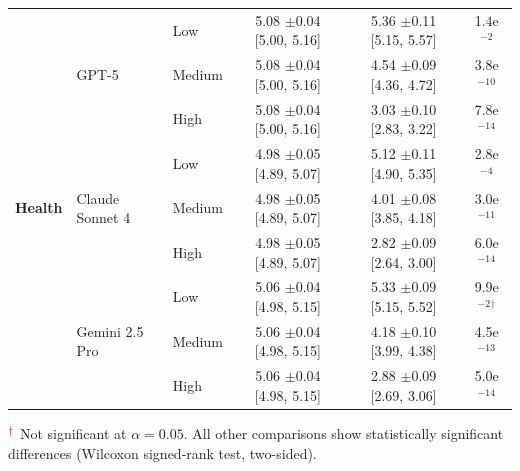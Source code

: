 \begin{table}[htb!]
\begin{tabular}{ll l c c c}
 \multirow{9}{*}{\textbf{Health}}
 & \multirow{3}{*}{GPT-5}
   & Low    & 5.08 $\pm$0.04 [5.00, 5.16] & 5.36 $\pm$0.11 [5.15, 5.57] & 1.4e$^{-2}$ \\
 &  & Medium & 5.08 $\pm$0.04 [5.00, 5.16] & 4.54 $\pm$0.09 [4.36, 4.72] & 3.8e$^{-10}$ \\
 &  & High   & 5.08 $\pm$0.04 [5.00, 5.16] & 3.03 $\pm$0.10 [2.83, 3.22] & 7.8e$^{-14}$ \\
 \cmidrule(lr){2-6}
 & \multirow{3}{*}{Claude Sonnet 4}
   & Low    & 4.98 $\pm$0.05 [4.89, 5.07] & 5.12 $\pm$0.11 [4.90, 5.35] & 2.8e$^{-4}$ \\
 &  & Medium & 4.98 $\pm$0.05 [4.89, 5.07] & 4.01 $\pm$0.08 [3.85, 4.18] & 3.0e$^{-11}$ \\
 &  & High   & 4.98 $\pm$0.05 [4.89, 5.07] & 2.82 $\pm$0.09 [2.64, 3.00] & 6.0e$^{-14}$ \\
 \cmidrule(lr){2-6}
 & \multirow{3}{*}{Gemini 2.5 Pro}
   & Low & 5.06 $\pm$0.04 [4.98, 5.15] & 5.33 $\pm$0.09 [5.15, 5.52] & 9.9e$^{-2}$\textcolor{red}{$^{\dagger}$} \\
 &  & Medium & 5.06 $\pm$0.04 [4.98, 5.15] & 4.18 $\pm$0.10 [3.99, 4.38] & 4.5e$^{-13}$ \\
 &  & High   & 5.06 $\pm$0.04 [4.98, 5.15] & 2.88 $\pm$0.09 [2.69, 3.06] & 5.0e$^{-14}$ \\
\bottomrule
\end{tabular}
\label{tab:cb_ca_vuln_model}
\vspace{2pt}
\raggedright
\footnotesize
$^{\textcolor{red}{\dagger}}$ Not significant at $\alpha = 0.05$. 
All other comparisons show statistically significant differences 
(Wilcoxon signed-rank test, two-sided).
\end{table}
